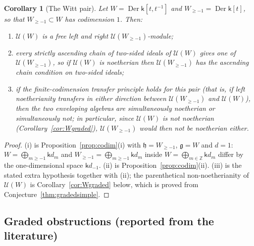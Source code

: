 \documentclass[11pt]{ctexart}
\theoremstyle{plain}
\newtheorem{corollary}[theorem]{Corollary}
\theoremstyle{definition}
\theoremstyle{remark}
\newcommand{\kk}{\mathsf{k}}
\newcommand{\gl}{\mathfrak{g}}
\newcommand{\hl}{\mathfrak{h}}
\newcommand{\UU}{\mathcal{U}}
\newcommand{\Der}{\operatorname{Der}}
\begin{document}
\begin{corollary}[The Witt pair]\label{cor:witt}
Let $W=\Der\kk[t,t^{-1}]$ and $W_{\ge-1}=\Der\kk[t]$, so that $W_{\ge-1}\subset W$ has
codimension $1$. Then:
\begin{enumerate}
\item[(i)] $\UU(W)$ is a free left and right $\UU(W_{\ge-1})$-module;
\item[(ii)] every strictly ascending chain of two-sided ideals of $\UU(W)$ gives one
of $\UU(W_{\ge-1})$, so if $\UU(W)$ is noetherian then $\UU(W_{\ge-1})$ has the
ascending chain condition on two-sided ideals;
\item[(iii)] if the finite-codimension transfer principle holds for this pair (that
is, if left noetherianity transfers in either direction between $\UU(W_{\ge-1})$ and
$\UU(W)$), then the two enveloping algebras are simultaneously noetherian or
simultaneously not; in particular, since $\UU(W)$ is not noetherian
(Corollary~\ref{cor:Wgraded}), $\UU(W_{\ge-1})$ would then not be noetherian either.
\end{enumerate}
\end{corollary}

\begin{proof}
(i) is Proposition~\ref{prop:codim}(i) with $\hl=W_{\ge-1}$, $\gl=W$ and $d=1$:
$W=\bigoplus_{m\ge-1}\kk d_m$ and $W_{\ge-1}=\bigoplus_{m\ge-1}\kk d_m$ inside
$W=\bigoplus_{m\in\mathbb{Z}}\kk d_m$ differ by the one-dimensional space $\kk d_{-1}$.
(ii) is Proposition~\ref{prop:codim}(ii). (iii) is the stated extra hypothesis
together with (ii); the parenthetical non-noetherianity of $\UU(W)$ is
Corollary~\ref{cor:Wgraded} below, which is proved from
Conjecture~\ref{thm:gradedsimple}.
\end{proof}

\subsection{Graded obstructions (reported from the literature)}
\end{document}
